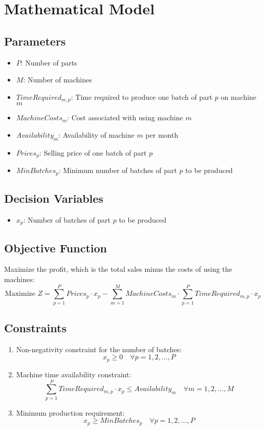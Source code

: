 \documentclass{article}
\begin{document}
\section*{Mathematical Model}

\subsection*{Parameters}
\begin{itemize}
    \item $P$: Number of parts
    \item $M$: Number of machines
    \item $TimeRequired_{m,p}$: Time required to produce one batch of part $p$ on machine $m$
    \item $MachineCosts_m$: Cost associated with using machine $m$
    \item $Availability_m$: Availability of machine $m$ per month
    \item $Prices_p$: Selling price of one batch of part $p$
    \item $MinBatches_p$: Minimum number of batches of part $p$ to be produced
\end{itemize}

\subsection*{Decision Variables}
\begin{itemize}
    \item $x_p$: Number of batches of part $p$ to be produced
\end{itemize}

\subsection*{Objective Function}
Maximize the profit, which is the total sales minus the costs of using the machines:
\[
\text{Maximize } Z = \sum_{p=1}^{P} Prices_p \cdot x_p - \sum_{m=1}^{M} MachineCosts_m \cdot \sum_{p=1}^{P} TimeRequired_{m,p} \cdot x_p
\]

\subsection*{Constraints}
\begin{enumerate}
    \item Non-negativity constraint for the number of batches:
    \[
    x_p \geq 0 \quad \forall p = 1, 2, \ldots, P
    \]
    \item Machine time availability constraint:
    \[
    \sum_{p=1}^{P} TimeRequired_{m,p} \cdot x_p \leq Availability_m \quad \forall m = 1, 2, \ldots, M
    \]
    \item Minimum production requirement:
    \[
    x_p \geq MinBatches_p \quad \forall p = 1, 2, \ldots, P
    \]
\end{enumerate}
\end{document}
